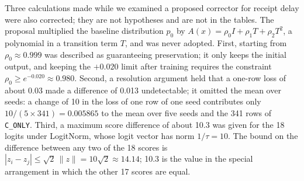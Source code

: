 Three calculations made while we examined a proposed corrector for
receipt delay were also corrected; they are not hypotheses and are not
in the tables. The proposal multiplied the baseline distribution $p_0$
by $A(x) = \rho_0 I + \rho_1 T + \rho_2 T^2$, a polynomial in a
transition term $T$, and was never adopted. First, starting from
$\rho_0 \approx 0.999$ was described as guaranteeing preservation; it
only keeps the initial output, and keeping the $+0.020$ limit after
training requires the constraint $\rho_0 \ge e^{-0.020} \approx 0.980$.
Second, a resolution argument held that a one-row loss of about 0.03
made a difference of 0.013 undetectable; it omitted the mean over
seeds: a change of 10 in the loss of one row of one seed contributes
only $10/(5 \times 341) = 0.005865$ to the mean over five seeds and the
341 rows of \texttt{C\_ONLY}. Third, a maximum score difference of
about 10.3 was given for the 18 logits under LogitNorm, whose logit
vector has norm $1/\tau = 10$. The bound on the difference between any
two of the 18 scores is $|z_i - z_j| \le \sqrt{2}\,\lVert z \rVert =
10\sqrt{2} \approx 14.14$; 10.3 is the value in the special arrangement
in which the other 17 scores are equal.

